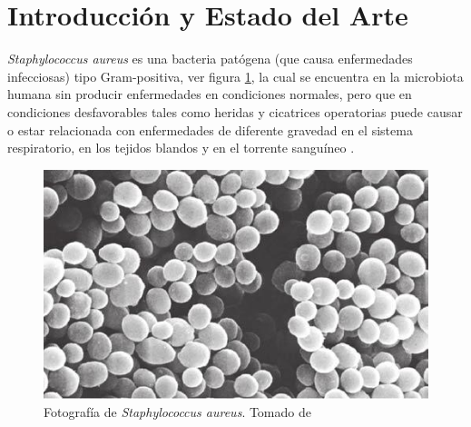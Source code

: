 \documentclass[%
 reprint,
 amsmath,amssymb,
 aps,
]{revtex4-1}
\begin{document}


\section{\label{sec:intro}Introducción y Estado del Arte}
\textit{Staphylococcus aureus} es una bacteria patógena (que causa enfermedades infecciosas) tipo Gram-positiva, ver figura \ref{fig:sta},  la cual se encuentra en la microbiota humana sin producir enfermedades en condiciones normales, pero que en condiciones desfavorables tales como heridas y cicatrices operatorias puede causar o estar relacionada con enfermedades de diferente gravedad en el sistema respiratorio, en los tejidos blandos y en el torrente sanguíneo \cite{1HarpavatS.NissimS.LipppincottsMicrocards:MicrobiologyFlashCards2012.}.\\
\begin{figure}[h]
  \includegraphics[width=\linewidth]{s_aureus.jpg}
  \caption{Fotografía  de \textit{Staphylococcus aureus}. Tomado de \cite{1HarpavatS.NissimS.LipppincottsMicrocards:MicrobiologyFlashCards2012.}}
  \label{fig:sta}
\end{figure}
\end{document}
